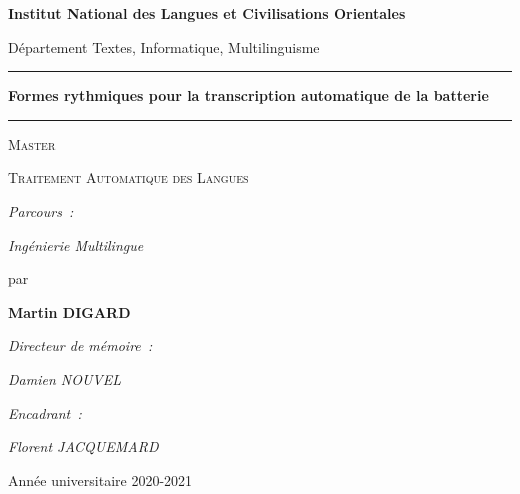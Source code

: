 \begin{center}
{\Large \textbf{Institut National des Langues et Civilisations Orientales}}


{\normalsize Département Textes, Informatique, Multilinguisme}

\hrule
{}
{\LARGE \textbf{Formes rythmiques pour la transcription automatique de la
batterie}}
\hrule


{\Huge \textsc{Master}}


{\LARGE \textsc{Traitement Automatique des Langues}}


{\normalsize \emph{Parcours~:}}


{\normalsize \emph{Ingénierie Multilingue}}


{\large par}


\textbf{{\LARGE Martin \textsc{DIGARD}}}


{\normalsize \emph{Directeur de mémoire~:}}


{\normalsize \emph{Damien NOUVEL}}


{\normalsize \emph{Encadrant~:}}


{\normalsize \emph{Florent JACQUEMARD}}


{\normalsize Année universitaire 2020-2021}

\end{center}

\cleardoublepage %
